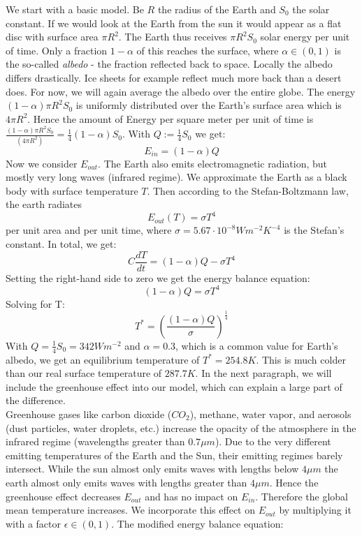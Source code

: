 \documentclass[%
thesis=student,%
coverpage=false,%
titlepage=false,%
headmarks=true, %
english,%
font=libertine, %
math=newpxtx, %
BCOR=5mm,%
coverBCOR=11mm%
]{tumbook}
\begin{document}
We start with a basic model.
Be $R$ the radius of the Earth and $S_{0}$ the solar constant. If we would look at the Earth from the sun it would appear as a flat disc with surface area $\pi R^2$. The Earth thus receives $\pi R^2 S_{0}$ solar energy per unit of time. Only a fraction $1-\alpha$ of this reaches the surface, where $\alpha \in (0,1)$ is the so-called \textit{albedo} - the fraction reflected back to space. Locally the albedo differs drastically. Ice sheets for example reflect much more back than a desert does. For now, we will again average the albedo over the entire globe. The energy $(1-\alpha)\pi R^2S_{0}$ is uniformly distributed over the Earth's surface area which is $4\pi R^2$. Hence the amount of Energy per square meter per unit of time is $\frac{(1-\alpha)\pi R^2S_{0}}{(4\pi R^2)} = \frac{1}{4}(1-\alpha)S_{0}$. With $Q:=\frac{1}{4}S_{0}$ we get: 
\begin{equation}
    E_{in} = (1-\alpha)Q
\end{equation}
Now we consider $E_{out}$. The Earth also emits electromagnetic radiation, but mostly very long waves (infrared regime). We approximate the Earth as a black body with surface temperature $T$. Then according to the Stefan-Boltzmann law, the earth radiates 
\begin{equation}
    E_{out}(T) = \sigma T^4
\end{equation}
per unit area and per unit time, where $\sigma = 5.67 \cdot 10^{-8}Wm^{-2}K^{-4}$ is the Stefan's constant. In total, we get: 
\begin{equation}
    C\frac{dT}{dt} = (1-\alpha)Q - \sigma T^4
    \label{temperature independent albedo EBM}
\end{equation}
Setting the right-hand side to zero we get the energy balance equation: 
\begin{equation}
    (1-\alpha)Q = \sigma T^4
\end{equation}
Solving for T: 
\begin{equation}
    T^* = (\frac{(1-\alpha)Q}{\sigma})^\frac{1}{4}
\end{equation}
With $Q = \frac{1}{4}S_{0}= 342 Wm^{-2}$ and $\alpha = 0.3$, which is a common value for Earth's albedo, we get an equilibrium temperature of $T^* = 254.8K$. This is much colder than our real surface temperature of $287.7K$. In the next paragraph, we will include the greenhouse effect into our model, which can explain a large part of the difference.
\\ 
Greenhouse gases like carbon dioxide ($CO_{2}$), methane, water vapor, and aerosols (dust particles, water droplets, etc.) increase the opacity of the atmosphere in the infrared regime (wavelengths greater than $0.7 \mu m$). Due to the very different emitting temperatures of the Earth and the Sun, their emitting regimes barely intersect. While the sun almost only emits waves with lengths below $4 \mu m$ the earth almost only emits waves with lengths greater than $4 \mu m$. Hence the greenhouse effect decreases $E_{out}$ and has no impact on $E_{in}$. Therefore the global mean temperature increases. We incorporate this effect on $E_{out}$ by multiplying it with a factor $\epsilon \in (0,1)$. The modified energy balance equation: 
\end{document}
